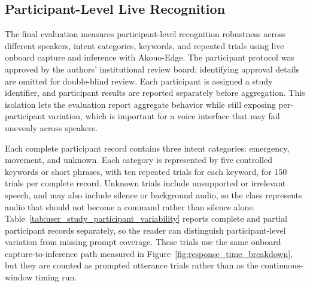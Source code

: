 
\subsection{Participant-Level Live Recognition}

The final evaluation measures participant-level recognition robustness across different speakers, intent categories, keywords, and repeated trials using live onboard capture and inference with Akouo-Edge. The participant protocol was approved by the authors' institutional review board; identifying approval details are omitted for double-blind review. Each participant is assigned a study identifier, and participant results are reported separately before aggregation. This isolation lets the evaluation report aggregate behavior while still exposing per-participant variation, which is important for a voice interface that may fail unevenly across speakers.

Each complete participant record contains three intent categories: emergency, movement, and unknown. Each category is represented by five controlled keywords or short phrases, with ten repeated trials for each keyword, for 150 trials per complete record. Unknown trials include unsupported or irrelevant speech, and may also include silence or background audio, so the class represents audio that should not become a command rather than silence alone. Table~\ref{tab:user_study_participant_variability} reports complete and partial participant records separately, so the reader can distinguish participant-level variation from missing prompt coverage. These trials use the same onboard capture-to-inference path measured in Figure~\ref{fig:response_time_breakdown}, but they are counted as prompted utterance trials rather than as the continuous-window timing run.

